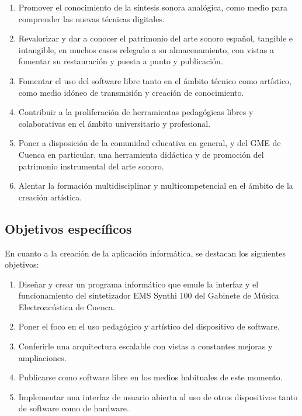 \begin{enumerate}
	\item Promover el conocimiento de la síntesis sonora analógica, como medio para comprender las nuevas técnicas digitales.
	\item Revalorizar y dar a conocer el patrimonio del arte sonoro español, tangible e intangible, en muchos casos relegado a su almacenamiento, con vistas a fomentar su restauración y puesta a punto y publicación.
	\item Fomentar el uso del software libre tanto en el ámbito técnico como artístico, como medio idóneo de transmisión y creación de conocimiento.
	\item Contribuir a la proliferación de herramientas pedagógicas libres y colaborativas en el ámbito universitario y profesional.
	\item Poner a disposición de la comunidad educativa en general, y del GME de Cuenca en particular, una herramienta didáctica y de promoción del patrimonio instrumental del arte sonoro.
	\item Alentar la formación multidisciplinar y multicompetencial en el ámbito de la creación artística.
\end{enumerate}





\subsection{Objetivos específicos}

En cuanto a la creación de la aplicación informática, se destacan los siguientes objetivos:

\begin{enumerate}
	
	\item Diseñar y crear un programa informático que emule la interfaz y el funcionamiento del sintetizador EMS Synthi 100 del Gabinete de Música Electroacústica de Cuenca.
	\item Poner el foco en el uso pedagógico y artístico del dispositivo de software.
	\item Conferirle una arquitectura escalable con vistas a constantes mejoras y ampliaciones.
	\item Publicarse como software libre en los medios habituales de este momento.
	\item Implementar una interfaz de usuario abierta al uso de otros dispositivos tanto de software como de hardware.
	
\end{enumerate}

